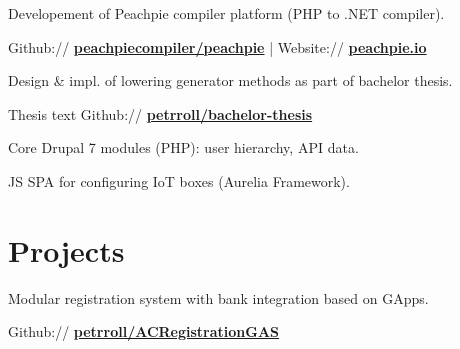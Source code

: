 \documentclass[a4paper]{deedy-resume} %
\begin{document}
\begin{minipage}[t]{0.62\textwidth}

\begin{tightitemize}
\item Developement of Peachpie compiler platform (PHP to .NET compiler).
\item Github:// \href{https://github.com/peachpiecompiler/peachpie}{\bf peachpiecompiler/peachpie} | Website:// \href{https://www.peachpie.io/}{\bf peachpie.io}
\item Design \& impl. of lowering generator methods as part of bachelor thesis.
\item Thesis text Github:// \href{https://github.com/petrroll/bachelor-thesis}{\bf petrroll/bachelor-thesis}
\end{tightitemize}

\sectionspace %



\begin{tightitemize}
\item Core Drupal 7 modules (PHP): user hierarchy, API data.
\item JS SPA for configuring IoT boxes (Aurelia Framework).
\end{tightitemize}

\sectionspace %

\section{Projects}


\emptyLocation %
\begin{tightitemize}
\item Modular registration system with bank integration based on GApps.
\item Github:// \href{https://github.com/petrroll/ACRegistrationGAS}{\bf petrroll/ACRegistrationGAS}
\end{tightitemize}


\end{minipage}
\end{document}
